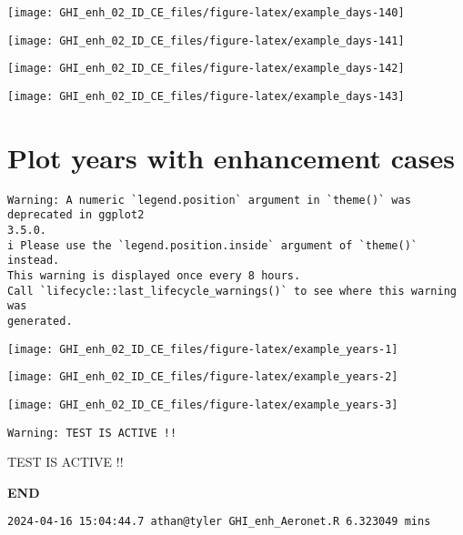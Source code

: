 \documentclass[
  10pt,
  a4paper,oneside]{article}
\begin{document}
\begin{center}\texttt{[image: GHI\_enh\_02\_ID\_CE\_files/figure-latex/example\_days-140]} \end{center}

\begin{center}\texttt{[image: GHI\_enh\_02\_ID\_CE\_files/figure-latex/example\_days-141]} \end{center}

\begin{center}\texttt{[image: GHI\_enh\_02\_ID\_CE\_files/figure-latex/example\_days-142]} \end{center}

\begin{center}\texttt{[image: GHI\_enh\_02\_ID\_CE\_files/figure-latex/example\_days-143]} \end{center}

\newpage
\FloatBarrier

\hypertarget{plot-years-with-enhancement-cases}{%
\section{Plot years with enhancement cases}\label{plot-years-with-enhancement-cases}}

\begin{verbatim}
Warning: A numeric `legend.position` argument in `theme()` was deprecated in ggplot2
3.5.0.
i Please use the `legend.position.inside` argument of `theme()` instead.
This warning is displayed once every 8 hours.
Call `lifecycle::last_lifecycle_warnings()` to see where this warning was
generated.
\end{verbatim}

\begin{center}\texttt{[image: GHI\_enh\_02\_ID\_CE\_files/figure-latex/example\_years-1]} \end{center}

\begin{center}\texttt{[image: GHI\_enh\_02\_ID\_CE\_files/figure-latex/example\_years-2]} \end{center}

\begin{center}\texttt{[image: GHI\_enh\_02\_ID\_CE\_files/figure-latex/example\_years-3]} \end{center}

\begin{verbatim}
Warning: TEST IS ACTIVE !!
\end{verbatim}

TEST IS ACTIVE !!

\textbf{END}

\begin{verbatim}
2024-04-16 15:04:44.7 athan@tyler GHI_enh_Aeronet.R 6.323049 mins
\end{verbatim}
\end{document}
